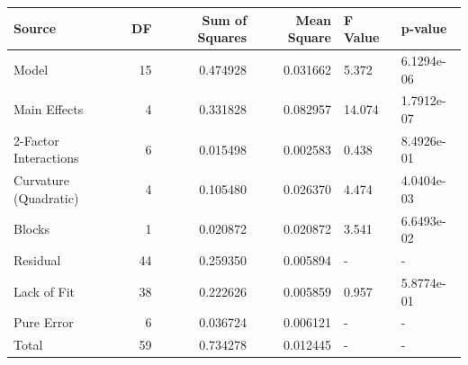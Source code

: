 \begin{tabular}{lrrrll}
\toprule
Source & DF & Sum of Squares & Mean Square & F Value & p-value \\
\midrule
Model & 15 & 0.474928 & 0.031662 & 5.372 & 6.1294e-06 \\
  Main Effects & 4 & 0.331828 & 0.082957 & 14.074 & 1.7912e-07 \\
  2-Factor Interactions & 6 & 0.015498 & 0.002583 & 0.438 & 8.4926e-01 \\
  Curvature (Quadratic) & 4 & 0.105480 & 0.026370 & 4.474 & 4.0404e-03 \\
  Blocks & 1 & 0.020872 & 0.020872 & 3.541 & 6.6493e-02 \\
Residual & 44 & 0.259350 & 0.005894 & - & - \\
  Lack of Fit & 38 & 0.222626 & 0.005859 & 0.957 & 5.8774e-01 \\
  Pure Error & 6 & 0.036724 & 0.006121 & - & - \\
Total & 59 & 0.734278 & 0.012445 & - & - \\
\bottomrule
\end{tabular}
